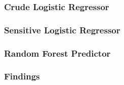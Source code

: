 \documentclass{beamer}
\begin{document}
\begin{frame}
          \frametitle{Crude Logistic Regressor}

\end{frame}

\begin{frame}
          \frametitle{Sensitive Logistic Regressor}

\end{frame}

\begin{frame}
          \frametitle{Random Forest Predictor}

\end{frame}


\begin{frame}
          \frametitle{Findings}

\end{frame}
\end{document}
